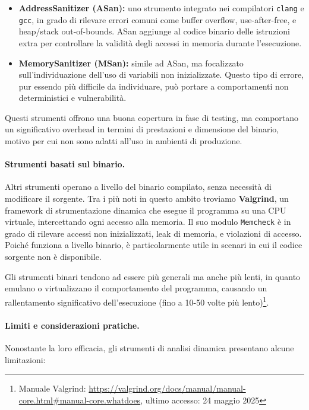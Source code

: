 \begin{itemize}
  \item \textbf{AddressSanitizer (ASan):} uno strumento integrato nei
    compilatori \texttt{clang} e \texttt{gcc}, in grado di rilevare errori comuni
    come buffer overflow, use-after-free, e heap/stack out-of-bounds. ASan
    aggiunge al codice binario delle istruzioni extra per controllare la
    validità degli accessi in memoria durante l'esecuzione.

  \item \textbf{MemorySanitizer (MSan):} simile ad ASan, ma focalizzato sull'individuazione
    dell'uso di variabili non inizializzate. Questo tipo di errore, pur essendo più
    difficile da individuare, può portare a comportamenti non deterministici e
    vulnerabilità.
\end{itemize}

Questi strumenti offrono una buona copertura in fase di testing, ma comportano un
significativo overhead in termini di prestazioni e dimensione del binario,
motivo per cui non sono adatti all'uso in ambienti di produzione.

\paragraph{Strumenti basati sul binario.}
Altri strumenti operano a livello del binario compilato, senza necessità di
modificare il sorgente. Tra i più noti in questo ambito troviamo \textbf{Valgrind},
un framework di strumentazione dinamica che esegue il programma su una CPU virtuale,
intercettando ogni accesso alla memoria. Il suo modulo \texttt{Memcheck} è in
grado di rilevare accessi non inizializzati, leak di memoria, e violazioni di
accesso. Poiché funziona a livello binario, è particolarmente utile in scenari
in cui il codice sorgente non è disponibile.

Gli strumenti binari tendono ad essere più generali ma anche più lenti, in quanto
emulano o virtualizzano il comportamento del programma, causando un
rallentamento significativo dell'esecuzione (fino a 10-50 volte più lento)\footnote{Manuale
Valgrind: \url{https://valgrind.org/docs/manual/manual-core.html\#manual-core.whatdoes},
ultimo accesso: 24 maggio 2025}.

\paragraph{Limiti e considerazioni pratiche.}
Nonostante la loro efficacia, gli strumenti di analisi dinamica presentano alcune
limitazioni:


